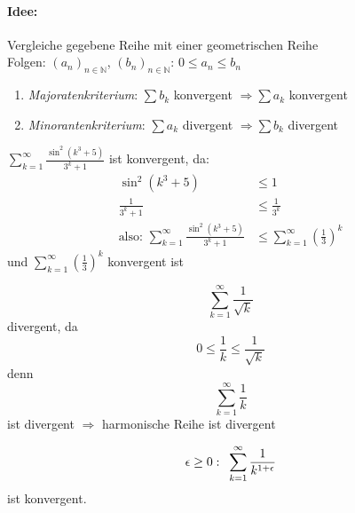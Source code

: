 \paragraph{Idee:} Vergleiche gegebene Reihe mit einer geometrischen Reihe
\\
Folgen: $ (a_n)_{n \in \mathbb{N}} $, $ (b_n)_{n \in \mathbb{N}} $: $ 0 \leq a_n \leq b_n$

\begin{enumerate}
    \item \emph{Majoratenkriterium}: $\sum b_k$ konvergent $\Rightarrow \sum a_k$ konvergent
    \item \emph{Minorantenkriterium}: $\sum a_k$ divergent $\Rightarrow \sum b_k$ divergent
\end{enumerate}

\begin{example}
    $ \sum_{k=1}^{\infty} \frac{\sin^2 \left( k^3 + 5 \right) }{3^k + 1} $ ist konvergent, da:
	\begin{align*}
        \sin^2 \left(k^3 + 5 \right) &\leq 1 \\
        \frac{1}{3^k+1} &\leq \frac{1}{3^k} \\
        \text{also: } \sum_{k=1}^{\infty} \frac{\sin^2 \left( k^3 + 5 \right) }{3^k + 1} &\leq \sum_{k=1}^{\infty} \left( \frac{1}{3} \right)^k
    \end{align*}
    und $\sum_{k=1}^{\infty} \left( \frac{1}{3} \right)^k$ konvergent ist
\end{example}

\begin{example}
    \begin{equation*} \sum_{k=1}^{\infty} \frac{1}{\sqrt{k}} \end{equation*} divergent, da \begin{equation*} 0 \leq \frac{1}{k} \leq \frac{1}{\sqrt{k}} \end{equation*}
    denn \begin{equation*}\sum_{k=1}^{\infty} \frac{1}{k}\end{equation*} ist divergent $\Rightarrow$ harmonische Reihe ist divergent
\end{example}

\begin{note}
    \begin{equation*}
        \epsilon \ge 0: \hspace{5px} \sum_{k=1}^{\infty} \frac{1}{k^{1+\epsilon}}
    \end{equation*}
    ist konvergent.
\end{note}

